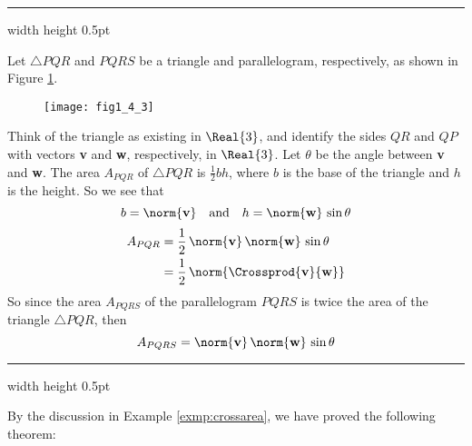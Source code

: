 \vspace{4mm}
\hrule width \textwidth height 0.5pt
\begin{exmp}\label{exmp:crossarea}
 Let $\triangle PQR$ and $PQRS$ be a triangle and parallelogram, respectively, as shown in Figure \ref{fig:crossarea}.

 \begin{figure}[h]
 \begin{center}
  \texttt{[image: fig1\_4\_3]}\vspace{-5mm}
 \end{center}
 \caption[]{}
 \label{fig:crossarea}
\end{figure}

 Think of the triangle as existing in $\Real{3}$, and identify the sides $QR$ and $QP$ with vectors \textbf{v} and
 \textbf{w}, respectively, in $\Real{3}$. Let $\theta$ be the angle between \textbf{v} and \textbf{w}. The area
 $A_{PQR}$ of $\triangle PQR$ is $\frac{1}{2} b h$, where $b$ is the base of the triangle and $h$ is the height. So
 we see that
 \begin{displaymath}
  b = \norm{\textbf{v}} \quad \text{and} \quad h = \norm{\textbf{w}}\,\sin \theta
 \end{displaymath}
 \begin{align*}
  A_{PQR} &= \frac{1}{2}\,\norm{\textbf{v}}\,\norm{\textbf{w}}\,\sin \theta\\
  &= \frac{1}{2}\,\norm{\Crossprod{\textbf{v}}{\textbf{w}}}
 \end{align*}
 So since the area $A_{PQRS}$ of the parallelogram $PQRS$ is twice the area of the triangle $\triangle PQR$, then
 \begin{displaymath}
  A_{PQRS} = \norm{\textbf{v}}\,\norm{\textbf{w}}\,\sin \theta
 \end{displaymath}
\end{exmp}
\hrule width \textwidth height 0.5pt
\vspace{4mm}

By the discussion in Example \ref{exmp:crossarea}, we have proved the following theorem:

